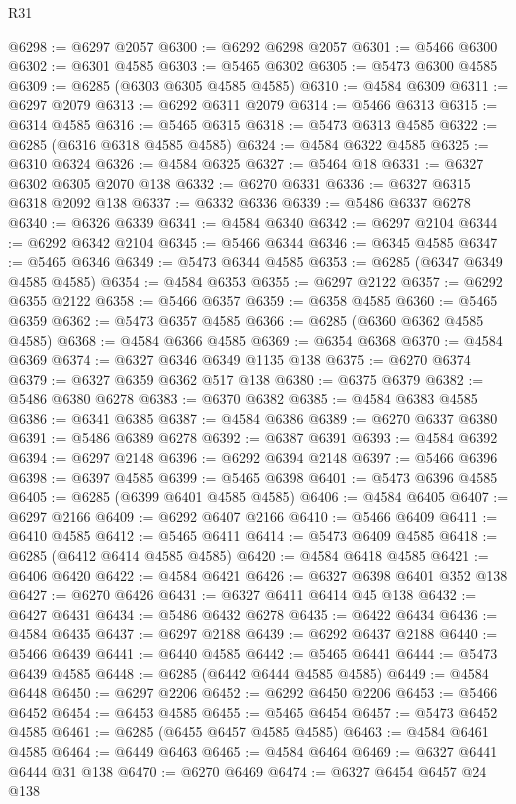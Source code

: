 \begin{lexlean}{R31}
\begin{coremodule}
@6298 := @6297 @2057
@6300 := @6292 @6298 @2057
@6301 := @5466 @6300
@6302 := @6301 @4585
@6303 := @5465 @6302
@6305 := @5473 @6300 @4585
@6309 := @6285 (@6303 @6305 @4585 @4585)
@6310 := @4584 @6309
@6311 := @6297 @2079
@6313 := @6292 @6311 @2079
@6314 := @5466 @6313
@6315 := @6314 @4585
@6316 := @5465 @6315
@6318 := @5473 @6313 @4585
@6322 := @6285 (@6316 @6318 @4585 @4585)
@6324 := @4584 @6322 @4585
@6325 := @6310 @6324
@6326 := @4584 @6325
@6327 := @5464 @18
@6331 := @6327 @6302 @6305 @2070 @138
@6332 := @6270 @6331
@6336 := @6327 @6315 @6318 @2092 @138
@6337 := @6332 @6336
@6339 := @5486 @6337 @6278
@6340 := @6326 @6339
@6341 := @4584 @6340
@6342 := @6297 @2104
@6344 := @6292 @6342 @2104
@6345 := @5466 @6344
@6346 := @6345 @4585
@6347 := @5465 @6346
@6349 := @5473 @6344 @4585
@6353 := @6285 (@6347 @6349 @4585 @4585)
@6354 := @4584 @6353
@6355 := @6297 @2122
@6357 := @6292 @6355 @2122
@6358 := @5466 @6357
@6359 := @6358 @4585
@6360 := @5465 @6359
@6362 := @5473 @6357 @4585
@6366 := @6285 (@6360 @6362 @4585 @4585)
@6368 := @4584 @6366 @4585
@6369 := @6354 @6368
@6370 := @4584 @6369
@6374 := @6327 @6346 @6349 @1135 @138
@6375 := @6270 @6374
@6379 := @6327 @6359 @6362 @517 @138
@6380 := @6375 @6379
@6382 := @5486 @6380 @6278
@6383 := @6370 @6382
@6385 := @4584 @6383 @4585
@6386 := @6341 @6385
@6387 := @4584 @6386
@6389 := @6270 @6337 @6380
@6391 := @5486 @6389 @6278
@6392 := @6387 @6391
@6393 := @4584 @6392
@6394 := @6297 @2148
@6396 := @6292 @6394 @2148
@6397 := @5466 @6396
@6398 := @6397 @4585
@6399 := @5465 @6398
@6401 := @5473 @6396 @4585
@6405 := @6285 (@6399 @6401 @4585 @4585)
@6406 := @4584 @6405
@6407 := @6297 @2166
@6409 := @6292 @6407 @2166
@6410 := @5466 @6409
@6411 := @6410 @4585
@6412 := @5465 @6411
@6414 := @5473 @6409 @4585
@6418 := @6285 (@6412 @6414 @4585 @4585)
@6420 := @4584 @6418 @4585
@6421 := @6406 @6420
@6422 := @4584 @6421
@6426 := @6327 @6398 @6401 @352 @138
@6427 := @6270 @6426
@6431 := @6327 @6411 @6414 @45 @138
@6432 := @6427 @6431
@6434 := @5486 @6432 @6278
@6435 := @6422 @6434
@6436 := @4584 @6435
@6437 := @6297 @2188
@6439 := @6292 @6437 @2188
@6440 := @5466 @6439
@6441 := @6440 @4585
@6442 := @5465 @6441
@6444 := @5473 @6439 @4585
@6448 := @6285 (@6442 @6444 @4585 @4585)
@6449 := @4584 @6448
@6450 := @6297 @2206
@6452 := @6292 @6450 @2206
@6453 := @5466 @6452
@6454 := @6453 @4585
@6455 := @5465 @6454
@6457 := @5473 @6452 @4585
@6461 := @6285 (@6455 @6457 @4585 @4585)
@6463 := @4584 @6461 @4585
@6464 := @6449 @6463
@6465 := @4584 @6464
@6469 := @6327 @6441 @6444 @31 @138
@6470 := @6270 @6469
@6474 := @6327 @6454 @6457 @24 @138

\end{coremodule}
\end{lexlean}
